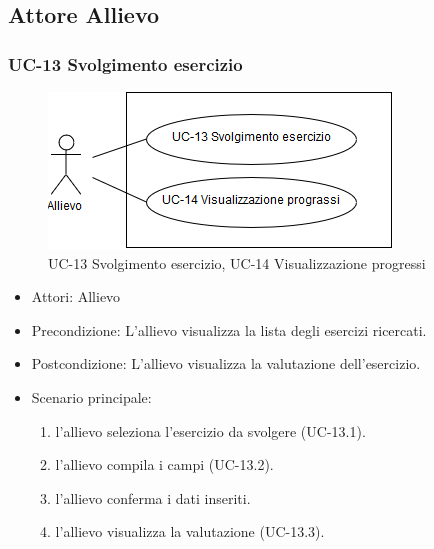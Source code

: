 \newpage


					
					
					
\subsection{Attore Allievo}
	\subsubsection{UC-13 Svolgimento esercizio}
	\begin{figure}[h]
			\centering
			\includegraphics[scale=0.7]{images/UC-13.png}
			\caption{UC-13 Svolgimento esercizio, UC-14 Visualizzazione progressi}
	\end{figure}	
	\begin{itemize}
	\item Attori: Allievo
			\item Precondizione:  L'allievo visualizza la lista degli esercizi ricercati.
			\item Postcondizione: L'allievo visualizza la valutazione dell'esercizio.
			\item Scenario principale:
			\begin{enumerate}
				\item l'allievo seleziona l'esercizio da svolgere (UC-13.1).
				\item l'allievo compila i campi (UC-13.2).
				\item l'allievo conferma i dati inseriti.
				\item l'allievo visualizza la valutazione (UC-13.3).
			\end{enumerate}
	\end{itemize}
			
